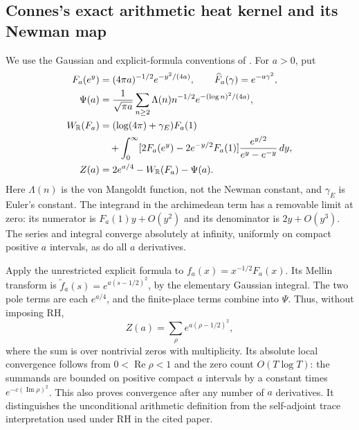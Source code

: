 \subsection{Connes's exact arithmetic heat kernel and its Newman map}
\label{sec:rh-connes-heat-tests}

We use the Gaussian and explicit-formula conventions of
\cite[\S2--4, equations (5), (9), (13), (25)]{connesHeat2024}.
For $a>0$, put
\begin{align}
 F_a(e^y)&=(4\pi a)^{-1/2}e^{-y^2/(4a)},\qquad
 \widehat F_a(\gamma)=e^{-a\gamma^2},\\
 \Psi(a)&=\frac1{\sqrt{\pi a}}\sum_{n\ge2}
       \Lambda(n)n^{-1/2}e^{-(\log n)^2/(4a)},\\
 W_{\mathbb R}(F_a)&=(\log(4\pi)+\gamma_E)F_a(1)\notag\\
 &\quad+\int_0^\infty
 [2F_a(e^y)-2e^{-y/2}F_a(1)]
 \frac{e^{y/2}}{e^y-e^{-y}}\,dy,\\
 Z(a)&=2e^{a/4}-W_{\mathbb R}(F_a)-\Psi(a).
 \label{eq:rh-connes-arithmetic-heat}
\end{align}
Here $\Lambda(n)$ is the von Mangoldt function, not the Newman
constant, and $\gamma_E$ is Euler's constant. The integrand in the
archimedean term has a removable limit at zero: its numerator is
$F_a(1)y+O(y^2)$ and its denominator is $2y+O(y^3)$.
The series and integral converge absolutely at infinity, uniformly
on compact positive $a$ intervals, as do all $a$ derivatives.

Apply the unrestricted explicit formula to
$f_a(x)=x^{-1/2}F_a(x)$. Its Mellin transform is
$\widetilde f_a(s)=e^{a(s-1/2)^2}$, by the elementary Gaussian
integral. The two pole terms are each $e^{a/4}$, and the finite-place
terms combine into $\Psi$. Thus, without imposing RH,
\begin{equation}
 Z(a)=\sum_{\rho}e^{a(\rho-1/2)^2},
 \label{eq:rh-heat-all-zeros}
\end{equation}
where the sum is over nontrivial zeros with multiplicity. Its
absolute local convergence follows from $0<\operatorname{Re}\rho<1$
and the zero count $O(T\log T)$: the summands are bounded on positive
compact $a$ intervals by a constant times $e^{-c(\operatorname{Im}\rho)^2}$.
This also proves convergence after any number of $a$ derivatives.
It distinguishes the unconditional arithmetic definition from the
self-adjoint trace interpretation used under RH in the cited paper.

